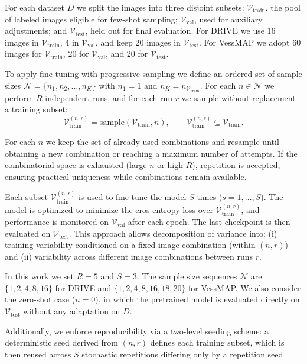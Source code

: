 \documentclass[%
reprint,
nofootinbib,
 amsmath,amssymb,
aps,
superscriptaddress,
showkeys,
longbibliography
]{revtex4-1}
\begin{document}
For each dataset $D$ we split the images into three disjoint subsets: $\mathcal{V}_{\text{train}}$, the pool of labeled images eligible for few-shot sampling; $\mathcal{V}_{\text{val}}$, used for auxiliary adjustments; and $\mathcal{V}_{\text{test}}$, held out for final evaluation. For DRIVE we use 16 images in $\mathcal{V}_{\text{train}}$, 4 in $\mathcal{V}_{\text{val}}$, and keep 20 images in $\mathcal{V}_{\text{test}}$. For VessMAP we adopt 60 images for $\mathcal{V}_{\text{train}}$, 20 for $\mathcal{V}_{\text{val}}$, and 20 for $\mathcal{V}_{\text{test}}$.

To apply fine-tuning with progressive sampling we define an ordered set of sample sizes $\mathcal{N} = \{ n_1, n_2, \ldots, n_K \}$ with $n_1 = 1$ and $n_K = n_{\mathcal{V}_{\text{train}}}$. For each $n \in \mathcal{N}$ we perform $R$ independent runs, and for each run $r$ we sample without replacement a training subset:
\[
\mathcal{V}^{(n,r)}_{\text{train}} = \text{sample}(\mathcal{V}_{\text{train}}, n), \qquad \mathcal{V}^{(n,r)}_{\text{train}} \subseteq \mathcal{V}_{\text{train}}.
\]


For each $n$ we keep the set of already used combinations and resample until obtaining a new combination or reaching a maximum number of attempts. If the combinatorial space is exhausted (large $n$ or high $R$), repetition is accepted, ensuring practical uniqueness while combinations remain available.

Each subset $\mathcal{V}^{(n,r)}_{\text{train}}$ is used to fine-tune the model $S$ times ($s=1,\ldots,S$). The model is optimized to minimize the cros-entropy loss over $\mathcal{V}^{(n,r)}_{\text{train}}$, and performance is monitored on $\mathcal{V}_{\text{val}}$ after each epoch. The last checkpoint is then evaluated on $\mathcal{V}_{\text{test}}$. This approach allows decomposition of variance into: (i) training variability conditioned on a fixed image combination (within $(n,r)$) and (ii) variability across different image combinations between runs $r$.

In this work we set $R=5$ and $S=3$. The sample size sequences $\mathcal{N}$ are $\{1,2,4,8,16\}$ for DRIVE and $\{1,2,4,8,16,18,20\}$ for VessMAP. We also consider the zero-shot case ($n=0$), in which the pretrained model is evaluated directly on $\mathcal{V}_{\text{test}}$ without any adaptation on $D$. 

Additionally, we enforce reproducibility via a two-level seeding scheme: a deterministic seed derived from $(n,r)$ defines each training subset, which is then reused across $S$ stochastic repetitions differing only by a repetition seed
\end{document}
